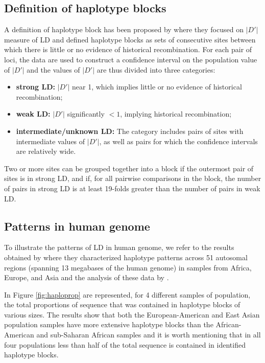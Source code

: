 \documentclass[]{book}
\begin{document}
\hypertarget{definition-of-haplotype-blocks}{%
\subsection*{Definition of haplotype blocks}\label{definition-of-haplotype-blocks}}

A definition of haplotype block has been proposed by
\citep{gabriel_structure_2002} where they focused on \(|D'|\) measure of LD and
defined haplotype blocks as sets of consecutive sites between which
there is little or no evidence of historical recombination. For each
pair of loci, the data are used to construct a confidence interval on
the population value of \(|D'|\) and the values of \(|D'|\) are thus divided
into three categories:

\begin{itemize}
\item
  \textbf{strong LD:} \(|D'|\) near 1, which implies little or no evidence of
  historical recombination;
\item
  \textbf{weak LD:} \(|D'|\) significantly \(< 1\), implying historical
  recombination;
\item
  \textbf{intermediate/unknown LD:} The category includes pairs of sites
  with intermediate values of \(|D'|\), as well as pairs for which the
  confidence intervals are relatively wide.
\end{itemize}

Two or more sites can be grouped together into a block if the outermost
pair of sites is in strong LD, and if, for all pairwise comparisons in
the block, the number of pairs in strong LD is at least 19-folds greater
than the number of pairs in weak LD.

\hypertarget{patterns-in-human-genome}{%
\subsection*{Patterns in human genome}\label{patterns-in-human-genome}}

To illustrate the patterns of LD in human genome, we refer to the
results obtained by \citep{gabriel_structure_2002} where they characterized
haplotype patterns across 51 autosomal regions (spanning 13 megabases of
the human genome) in samples from Africa, Europe, and Asia and the
analysis of these data by \citep{wall2003haplotype}.

In Figure \ref{fig:haploprop} are represented, for 4 different samples
of population, the total proportions of sequence that was contained in
haplotype blocks of various sizes. The results show that both the
European-American and East Asian population samples have more extensive
haplotype blocks than the African-American and sub-Saharan African
samples and it is worth mentioning that in all four populations less
than half of the total sequence is contained in identified haplotype
blocks.
\end{document}
